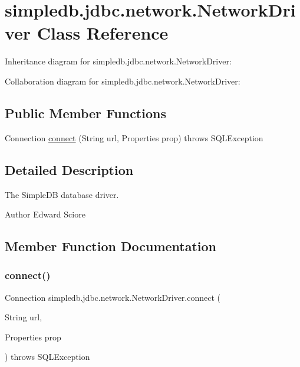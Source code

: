 \hypertarget{classsimpledb_1_1jdbc_1_1network_1_1NetworkDriver}{}\section{simpledb.\+jdbc.\+network.\+Network\+Driver Class Reference}
\label{classsimpledb_1_1jdbc_1_1network_1_1NetworkDriver}


Inheritance diagram for simpledb.\+jdbc.\+network.\+Network\+Driver\+:


Collaboration diagram for simpledb.\+jdbc.\+network.\+Network\+Driver\+:
\subsection*{Public Member Functions}
\begin{DoxyCompactItemize}
\item 
Connection \hyperlink{classsimpledb_1_1jdbc_1_1network_1_1NetworkDriver_af6428f6dfb94b5cd952281366037fc45}{connect} (String url, Properties prop)  throws S\+Q\+L\+Exception 
\end{DoxyCompactItemize}


\subsection{Detailed Description}
The Simple\+DB database driver. \begin{DoxyAuthor}{Author}
Edward Sciore 
\end{DoxyAuthor}


\subsection{Member Function Documentation}
\mbox{\label{classsimpledb_1_1jdbc_1_1network_1_1NetworkDriver_af6428f6dfb94b5cd952281366037fc45}} 
\subsubsection{\texorpdfstring{connect()}{connect()}}
{\footnotesize\ttfamily Connection simpledb.\+jdbc.\+network.\+Network\+Driver.\+connect (\begin{DoxyParamCaption}\item[{String}]{url,  }\item[{Properties}]{prop }\end{DoxyParamCaption}) throws S\+Q\+L\+Exception\hspace{0.3cm}{\ttfamily [inline]}}

